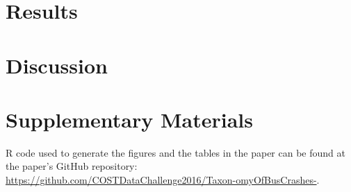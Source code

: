 \documentclass[11pt]{asaproc}
\begin{document}
\section{Results} \label{sec:results}

\section{Discussion} \label{sec:discussion}


\section{Supplementary Materials}
R code used to generate the figures and the tables in the paper can be 
found at the paper's GitHub repository: \url{https://github.com/COSTDataChallenge2016/Taxon-omyOfBusCrashes-}.
\FloatBarrier



%
\end{document}
